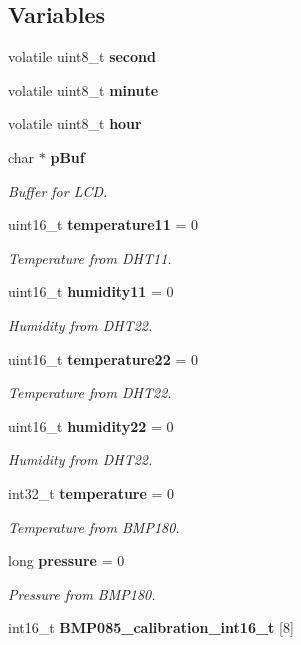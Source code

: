 \subsection*{Variables}
\begin{DoxyCompactItemize}
\item 
volatile uint8\+\_\+t \textbf{ second}
\item 
volatile uint8\+\_\+t \textbf{ minute}
\item 
volatile uint8\+\_\+t \textbf{ hour}
\item 
char $\ast$ \textbf{ p\+Buf}
\begin{DoxyCompactList}\small\item\em Buffer for L\+CD. \end{DoxyCompactList}\item 
uint16\+\_\+t \textbf{ temperature11} = 0
\begin{DoxyCompactList}\small\item\em Temperature from D\+H\+T11. \end{DoxyCompactList}\item 
uint16\+\_\+t \textbf{ humidity11} = 0
\begin{DoxyCompactList}\small\item\em Humidity from D\+H\+T22. \end{DoxyCompactList}\item 
uint16\+\_\+t \textbf{ temperature22} = 0
\begin{DoxyCompactList}\small\item\em Temperature from D\+H\+T22. \end{DoxyCompactList}\item 
uint16\+\_\+t \textbf{ humidity22} = 0
\begin{DoxyCompactList}\small\item\em Humidity from D\+H\+T22. \end{DoxyCompactList}\item 
int32\+\_\+t \textbf{ temperature} = 0
\begin{DoxyCompactList}\small\item\em Temperature from B\+M\+P180. \end{DoxyCompactList}\item 
long \textbf{ pressure} = 0
\begin{DoxyCompactList}\small\item\em Pressure from B\+M\+P180. \end{DoxyCompactList}\item 
int16\+\_\+t \textbf{ B\+M\+P085\+\_\+calibration\+\_\+int16\+\_\+t} [8]

\end{DoxyCompactItemize}
